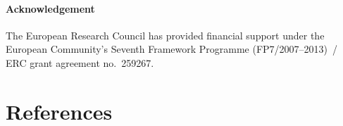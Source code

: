 \documentclass{elsarticle}
\begin{document}










{\small
\paragraph{Acknowledgement}
The European Research Council has provided financial support
under the European Community's Seventh Framework Programme (FP7/2007--2013)~/
ERC grant agreement no.~259267.
}

\section*{References}




\end{document}
